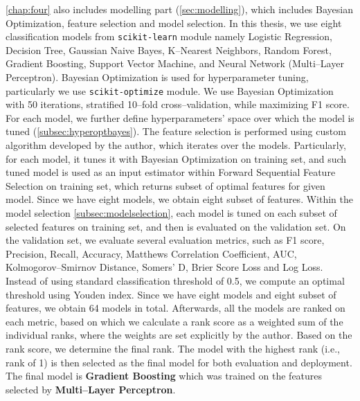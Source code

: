\autoref{chap:four} also includes modelling part (\autoref{sec:modelling}), which includes Bayesian Optimization, feature selection and model selection.
In this thesis, we use eight classification models from \lstinline{scikit-learn} module \citep{scikit-learn} namely Logistic Regression, Decision Tree, Gaussian Naive Bayes, K--Nearest Neighbors, Random Forest, Gradient Boosting, Support Vector Machine, and Neural Network (Multi--Layer Perceptron).
Bayesian Optimization is used for hyperparameter tuning, particularly we use \lstinline{scikit-optimize} module. We use Bayesian Optimization with 50 iterations, stratified 10--fold cross--validation, while maximizing F1 score. For each model, we further define hyperparameters' space over which the model is tuned (\autoref{subsec:hyperoptbayes}).
The feature selection is performed using custom algorithm developed by the author, which iterates over the models. Particularly, for each model, it tunes it with Bayesian Optimization on training set, and such tuned model is used as an input estimator within Forward Sequential Feature Selection on training set, which returns subset of optimal features for given model. Since we have eight models, we obtain eight subset of features.
Within the model selection \autoref{subsec:modelselection}, each model is tuned on each subset of selected features on training set, and then is evaluated on the validation set. On the validation set, we evaluate several evaluation metrics, such as F1 score, Precision, Recall, Accuracy, Matthews Correlation Coefficient, AUC, Kolmogorov--Smirnov Distance, Somers' D, Brier Score Loss and Log Loss.
Instead of using standard classification threshold of 0.5, we compute an optimal threshold using Youden index. Since we have eight models and eight subset of features, we obtain 64 models in total.
Afterwards, all the models are ranked on each metric, based on which we calculate a rank score as a weighted sum of the individual ranks, where the weights are set explicitly by the author. Based on the rank score, we determine the final rank. The model with the highest rank (i.e., rank of 1) is then selected as the final model for both evaluation and deployment.
The final model is \textbf{Gradient Boosting} which was trained on the features selected by \textbf{Multi--Layer Perceptron}.


